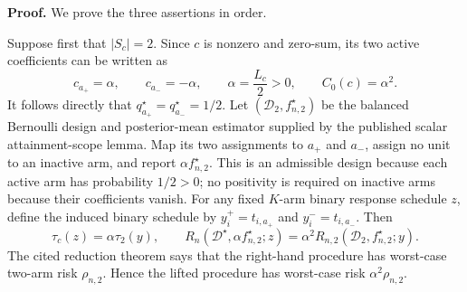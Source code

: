 \textbf{Proof.}
We prove the three assertions in order.

Suppose first that \(|S_c|=2\). Since \(c\) is nonzero and zero-sum, its two active coefficients can be written as
\[
 c_{a_+}=\alpha,
 \qquad c_{a_-}=-\alpha,
 \qquad
 \alpha=\frac{L_c}{2}>0,
 \qquad
 C_0(c)=\alpha^2.
\]
It follows directly that \(q_{a_+}^\star=q_{a_-}^\star=1/2\). Let \((\mathcal D_2,f_{n,2}^\star)\) be the balanced Bernoulli design and posterior-mean estimator supplied by the published scalar attainment-scope lemma. Map its two assignments to \(a_+\) and \(a_-\), assign no unit to an inactive arm, and report \(\alpha f_{n,2}^\star\). This is an admissible design because each active arm has probability \(1/2>0\); no positivity is required on inactive arms because their coefficients vanish. For any fixed \(K\)-arm binary response schedule \(z\), define the induced binary schedule by \(y_i^+=t_{i,a_+}\) and \(y_i^-=t_{i,a_-}\). Then
\[
 \tau_c(z)=\alpha\tau_2(y),
 \qquad
 R_n(\mathcal D^\star,\alpha f_{n,2}^\star;z)
 =\alpha^2R_{n,2}(\mathcal D_2,f_{n,2}^\star;y).
\]
The cited reduction theorem says that the right-hand procedure has worst-case two-arm risk \(\rho_{n,2}\). Hence the lifted procedure has worst-case risk \(\alpha^2\rho_{n,2}\).

